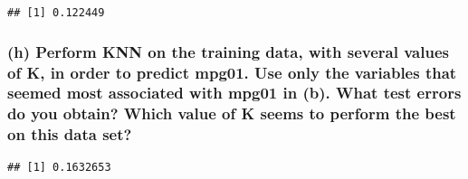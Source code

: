 \documentclass[
]{article}
\newenvironment{Shaded}{\begin{snugshade}}{\end{snugshade}}
\newcommand{\AttributeTok}[1]{\textcolor[rgb]{0.77,0.63,0.00}{#1}}
\newcommand{\ConstantTok}[1]{\textcolor[rgb]{0.00,0.00,0.00}{#1}}
\newcommand{\ControlFlowTok}[1]{\textcolor[rgb]{0.13,0.29,0.53}{\textbf{#1}}}
\newcommand{\DecValTok}[1]{\textcolor[rgb]{0.00,0.00,0.81}{#1}}
\newcommand{\FunctionTok}[1]{\textcolor[rgb]{0.00,0.00,0.00}{#1}}
\newcommand{\NormalTok}[1]{#1}
\newcommand{\OtherTok}[1]{\textcolor[rgb]{0.56,0.35,0.01}{#1}}
\newcommand{\SpecialCharTok}[1]{\textcolor[rgb]{0.00,0.00,0.00}{#1}}
\begin{document}
\begin{verbatim}
## [1] 0.122449
\end{verbatim}

\hypertarget{h-perform-knn-on-the-training-data-with-several-values-of-k-in-order-to-predict-mpg01.-use-only-the-variables-that-seemed-most-associated-with-mpg01-in-b.-what-test-errors-do-you-obtain-which-value-of-k-seems-to-perform-the-best-on-this-data-set}{%
\subsubsection{(h) Perform KNN on the training data, with several values
of K, in order to predict mpg01. Use only the variables that seemed most
associated with mpg01 in (b). What test errors do you obtain? Which
value of K seems to perform the best on this data
set?}\label{h-perform-knn-on-the-training-data-with-several-values-of-k-in-order-to-predict-mpg01.-use-only-the-variables-that-seemed-most-associated-with-mpg01-in-b.-what-test-errors-do-you-obtain-which-value-of-k-seems-to-perform-the-best-on-this-data-set}}

\begin{Shaded}
\end{Shaded}

\begin{verbatim}
## [1] 0.1632653
\end{verbatim}

\begin{Shaded}
\end{Shaded}
\end{document}
